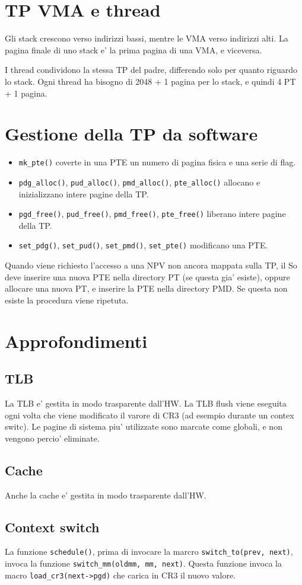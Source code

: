 \documentclass[12pt, a4paper]{report}
\begin{document}
\section{TP VMA e thread}
Gli stack crescono verso indirizzi bassi, mentre le VMA verso indirizzi alti.
La pagina finale di uno stack e' la prima pagina di una VMA, e viceversa.

I thread condividono la stessa TP del padre, differendo solo per quanto riguardo
lo stack. Ogni thread ha bisogno di 2048 + 1 pagina per lo stack, e quindi 4 PT
+ 1 pagina.

\section{Gestione della TP da software}
\begin{itemize}
	\item \texttt{mk\_pte()} coverte in una PTE un numero di pagina fisica e
		una serie di flag. 
	\item \texttt{pdg\_alloc()}, \texttt{pud\_alloc()}, \texttt{pmd\_alloc()},
		\texttt{pte\_alloc()} allocano e inizializzano intere pagine della TP.
	\item \texttt{pgd\_free()}, \texttt{pud\_free()}, \texttt{pmd\_free()},
		\texttt{pte\_free()} liberano intere pagine della TP.
	\item \texttt{set\_pdg()}, \texttt{set\_pud()}, \texttt{set\_pmd()},
		\texttt{set\_pte()} modificano una PTE.
\end{itemize}
Quando viene richiesto l'accesso a una NPV non ancora mappata sulla TP, il So
deve inserire una nuova PTE nella directory PT (se questa gia' esiste), oppure
allocare una nuova PT, e inserire la PTE nella directory PMD. Se questa non
esiste la procedura viene ripetuta.

\section{Approfondimenti}
\subsection{TLB}
La TLB e' gestita in modo trasparente dall'HW. La TLB flush viene eseguita ogni
volta che viene modificato il varore di CR3 (ad esempio durante un contex
switc). Le pagine di sistema piu' utilizzate sono marcate come globali, e non
vengono percio' eliminate.

\subsection{Cache}
Anche la cache e' gestita in modo trasparente dall'HW.

\subsection{Context switch}
La funzione \texttt{schedule()}, prima di invocare la marcro
\texttt{switch\_to(prev, next)}, invoca la funzione \texttt{switch\_mm(oldmm,
mm, next)}. Questa funzione invoca la macro \texttt{load_cr3(next->pgd)} che
carica in CR3 il nuovo valore.
\end{document}
